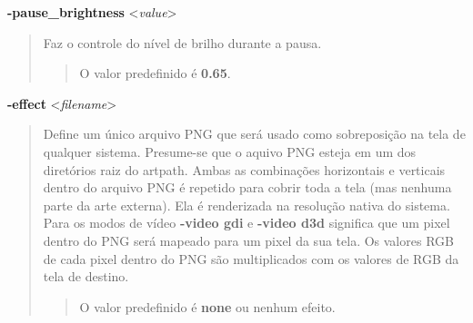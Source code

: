 \documentclass[letterpaper,10pt,brazil]{sphinxmanual}
\begin{document}
\label{commandline/commandline-all:mame-commandline-pausebrightness}
\textbf{-pause\_brightness} \textless{}\emph{value}\textgreater{}
\begin{quote}

Faz o controle do nível de brilho durante a pausa.
\begin{quote}

O valor predefinido é \textbf{0.65}.
\end{quote}
\end{quote}
\label{commandline/commandline-all:mame-commandline-effect}
\textbf{-effect} \textless{}\emph{filename}\textgreater{}
\begin{quote}

Define um único arquivo PNG que será usado como sobreposição na tela
de qualquer sistema. Presume-se que o aquivo PNG esteja em um dos
diretórios raiz do artpath. Ambas as combinações horizontais e
verticais dentro do arquivo PNG é repetido para cobrir toda a tela
(mas nenhuma parte da arte externa).
Ela é renderizada na resolução nativa do sistema. Para os modos de
vídeo \textbf{-video gdi} e \textbf{-video d3d} significa que um pixel dentro
do PNG será mapeado para um pixel da sua tela. Os valores RGB de
cada pixel dentro do PNG são multiplicados com os valores de RGB da
tela de destino.
\begin{quote}

O valor predefinido é \textbf{none} ou nenhum efeito.
\end{quote}
\end{quote}
\end{document}
